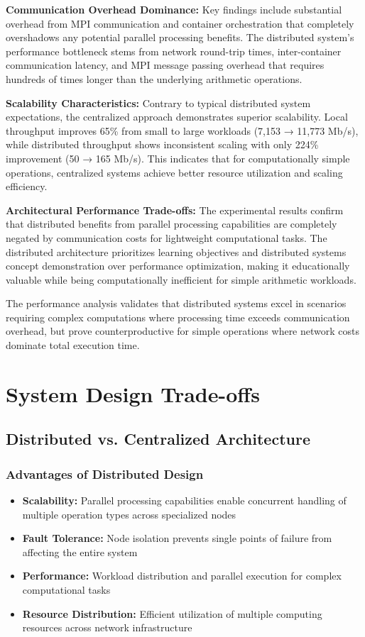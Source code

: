 \documentclass{article}
\begin{document}
\textbf{Communication Overhead Dominance:}
Key findings include substantial overhead from MPI communication and container orchestration that completely overshadows any potential parallel processing benefits. The distributed system's performance bottleneck stems from network round-trip times, inter-container communication latency, and MPI message passing overhead that requires hundreds of times longer than the underlying arithmetic operations.

\textbf{Scalability Characteristics:}
Contrary to typical distributed system expectations, the centralized approach demonstrates superior scalability. Local throughput improves 65\% from small to large workloads (7,153 → 11,773 Mb/s), while distributed throughput shows inconsistent scaling with only 224\% improvement (50 → 165 Mb/s). This indicates that for computationally simple operations, centralized systems achieve better resource utilization and scaling efficiency.

\textbf{Architectural Performance Trade-offs:}
The experimental results confirm that distributed benefits from parallel processing capabilities are completely negated by communication costs for lightweight computational tasks. The distributed architecture prioritizes learning objectives and distributed systems concept demonstration over performance optimization, making it educationally valuable while being computationally inefficient for simple arithmetic workloads.

The performance analysis validates that distributed systems excel in scenarios requiring complex computations where processing time exceeds communication overhead, but prove counterproductive for simple operations where network costs dominate total execution time.



\section{System Design Trade-offs}


\subsection{Distributed vs. Centralized Architecture}

\subsubsection{Advantages of Distributed Design}
\begin{itemize}
    \item \textbf{Scalability:} Parallel processing capabilities enable concurrent handling of multiple operation types across specialized nodes
    \item \textbf{Fault Tolerance:} Node isolation prevents single points of failure from affecting the entire system
    \item \textbf{Performance:} Workload distribution and parallel execution for complex computational tasks
    \item \textbf{Resource Distribution:} Efficient utilization of multiple computing resources across network infrastructure
\end{itemize}
\end{document}
